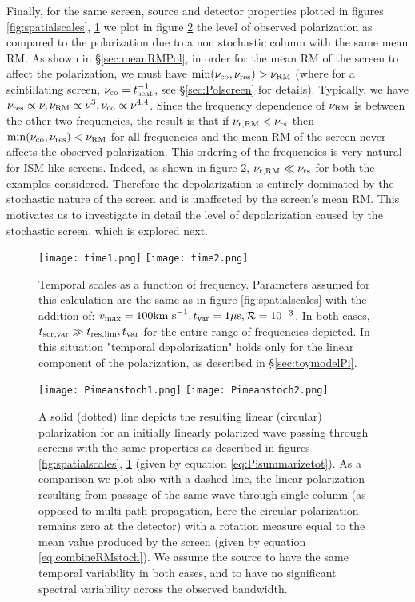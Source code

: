 \documentclass[fleqn,usenatbib]{mnras}
\begin{document}
	Finally, for the same screen, source and detector properties plotted in figures \ref{fig:spatialscales}, \ref{fig:tempscales} we plot in figure \ref{fig:polarizationvsmean} the level of observed polarization as compared to the polarization due to a non stochastic column with the same mean RM. As shown in \S \ref{sec:meanRMPol}, in order for the mean RM of the screen to affect the polarization, we must have $\min(\nu_{\rm co},\nu_{\rm res})>\nu_{\rm RM}$ (where for a scintillating screen, $\nu_{\rm co}=t_{\rm scat}^{-1}$, see \S \ref{sec:Polscreen} for details). Typically, we have $\nu_{\rm res}\propto \nu, \nu_{\rm RM}\propto \nu^3, \nu_{\rm co}\propto \nu^{4.4}$. Since the frequency dependence of $\nu_{\rm RM}$ is between the other two frequencies, the result is that if $\nu_{\rm r,RM}<\nu_{\rm rs}$ then $\min(\nu_{\rm co},\nu_{\rm res})<\nu_{\rm RM}$ for all frequencies and the mean RM of the screen never affects the observed polarization. This ordering of the frequencies is very natural for ISM-like screens. Indeed, as shown in figure \ref{fig:polarizationvsmean}, $\nu_{\rm r,RM}\ll \nu_{\rm rs}$ for both the examples considered. Therefore the depolarization is entirely dominated by the stochastic nature of the screen and is unaffected by the screen's mean RM. This motivates us to investigate in detail the level of depolarization caused by the stochastic screen, which is explored next.
	
	
	\begin{figure*}
		\centering
		\texttt{[image: time1.png]}
		\texttt{[image: time2.png]}
		\caption{Temporal scales as a function of frequency. Parameters assumed for this calculation are the same as in figure \ref{fig:spatialscales} with the addition of: $v_{\rm max}=100\mbox{km s}^{-1}, t_{\rm var}=1\mu\mbox{s},\mathcal{R}=10^{-3}$. In both cases, $t_{\rm scr,var}\gg t_{\rm res,lim},t_{\rm var}$ for the entire range of frequencies depicted. In this situation "temporal depolarization" holds only for the linear component of the polarization, as described in \S \ref{sec:toymodelPi}.}
		\label{fig:tempscales}
	\end{figure*}
	
	\begin{figure*}
		\centering
		\texttt{[image: Pimeanstoch1.png]}
		\texttt{[image: Pimeanstoch2.png]}
		\caption{ A solid (dotted) line depicts the resulting linear (circular) polarization for an initially linearly polarized wave passing through screens with the same properties as described in figures \ref{fig:spatialscales}, \ref{fig:tempscales} (given by equation \ref{eq:Pisummarizetot}). As a comparison we plot also with a dashed line, the linear polarization resulting from passage of the same wave through single column (as opposed to multi-path propagation, here the circular polarization remains zero at the detector) with a rotation measure equal to the mean value produced by the screen (given by equation \ref{eq:combineRMstoch}). We assume the source to have the same temporal variability in both cases, and to have no significant spectral variability across the observed bandwidth.}
		\label{fig:polarizationvsmean}
	\end{figure*}
	
\end{document}

